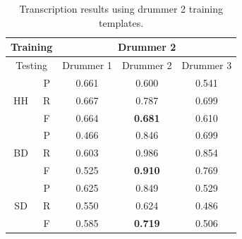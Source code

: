 \documentclass{article}
\begin{document}
\begin{table}[h]
\begin{center}
\begin{tabular}{|c|c|c|c|c|}
\hline
\multicolumn{2}{|c}{Training} & \multicolumn{3}{|c|}{Drummer 2}   \\ \hline
\multicolumn{2}{|c|}{Testing} & Drummer 1 & Drummer 2 & Drummer 3 \\ \hline
\multirow{3}{*}{HH}    & P    & 0.661     & 0.600     & 0.541     \\ \cline{2-5} 
                       & R    & 0.667     & 0.787     & 0.699     \\ \cline{2-5} 
                       & F    & 0.664     & \textbf{0.681}     & 0.610     \\ \hline
\multirow{3}{*}{BD}    & P    & 0.466     & 0.846     & 0.699     \\ \cline{2-5} 
                       & R    & 0.603     & 0.986     & 0.854     \\ \cline{2-5} 
                       & F    & 0.525     & \textbf{0.910}     & 0.769     \\ \hline
\multirow{3}{*}{SD}    & P    & 0.625     & 0.849     & 0.529     \\ \cline{2-5} 
                       & R    & 0.550     & 0.624     & 0.486     \\ \cline{2-5} 
                       & F    & 0.585     & \textbf{0.719}     & 0.506     \\ \hline
\end{tabular}
 \caption{Transcription results using drummer 2 training templates.}
 \label{tab:trainDr2}
\end{center}
\end{table}
\end{document}
